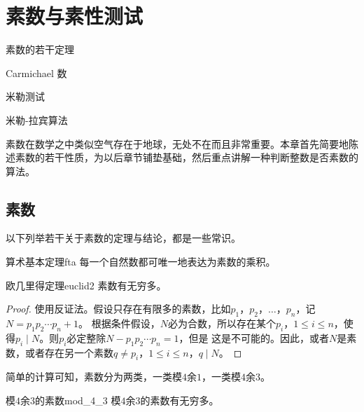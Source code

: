 
\chapter{素数与素性测试}
\label{chap:prime} 
\begin{introduction}
  \item 素数的若干定理
  \item Carmichael 数
  \item 米勒测试
  \item 米勒-拉宾算法
\end{introduction}

素数在数学之中类似空气存在于地球，无处不在而且非常重要。本章首先简要地陈述素数的若干性质，为以后章节铺垫基础，然后重点讲解一种判断整数是否素数的算法。
\section{素数}
\label{sec:prime}
以下列举若干关于素数的定理与结论，都是一些常识。

\begin{theorem}{算术基本定理}{fta}  
每一个自然数都可唯一地表达为素数的乘积。
\end{theorem}

\begin{theorem}{欧几里得定理}{euclid2}
素数有无穷多。
\end{theorem}
\begin{proof}
	使用反证法。假设只存在有限多的素数，比如$p_1$，$p_2$，$\ldots$，$p_n$，记$N = p_1 p_2 \cdots p_n + 1$。
	根据条件假设，$N$必为合数，所以存在某个$p_i$，$ 1 \leq i \leq n$，使得$p_i \mid N$。则$p_i$必定整除$N - p_1 p_2 \cdots p_n = 1$，但是
	这是不可能的。因此，或者$N$是素数，或者存在另一个素数$q \neq p_i$，$ 1 \leq i \leq n$，$q\mid N$。
\end{proof}
	
简单的计算可知，素数分为两类，一类模$4$余$1$，一类模$4$余$3$。
\begin{theorem}{模$4$余$3$的素数}{mod_4_3}
模$4$余$3$的素数有无穷多。
\end{theorem}

